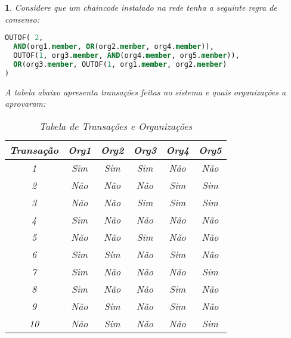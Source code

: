 \documentclass[letterpaper,11pt,leqno]{article}
\newtheorem{problem}{\refstepcounter{problemcount}{Problema}}
\begin{document}
\begin{problem}
Considere que um chaincode instalado na rede tenha a seguinte regra de consenso:

\begin{lstlisting}[language=SQL, caption=Chaincode]
OUTOF( 2,
  AND(org1.member, OR(org2.member, org4.member)),
  OUTOF(1, org3.member, AND(org4.member, org5.member)),
  OR(org3.member, OUTOF(1, org1.member, org2.member)
)
\end{lstlisting}

A tabela abaixo apresenta transações feitas no sistema e quais organizações a
aprovaram:

\begin{table}[h!]
	\centering
	\begin{tabular}{cccccc}
		\toprule
		\textbf{Transação} & \textbf{Org1} & \textbf{Org2} & \textbf{Org3} & \textbf{Org4} & \textbf{Org5} \\
		\midrule
		1                  & Sim           & Sim           & Sim           & Não           & Não           \\
		2                  & Não           & Não           & Não           & Sim           & Sim           \\
		3                  & Não           & Não           & Sim           & Sim           & Sim           \\
		4                  & Sim           & Não           & Não           & Não           & Não           \\
		5                  & Não           & Não           & Sim           & Não           & Não           \\
		6                  & Sim           & Sim           & Não           & Sim           & Não           \\
		7                  & Sim           & Não           & Não           & Não           & Sim           \\
		8                  & Sim           & Não           & Não           & Sim           & Não           \\
		9                  & Não           & Sim           & Não           & Sim           & Não           \\
		10                 & Não           & Sim           & Não           & Não           & Sim           \\
		\bottomrule
	\end{tabular}
	\caption{Tabela de Transações e Organizações}
	\label{tab:transacoes}
\end{table}

\end{problem}
\end{document}
